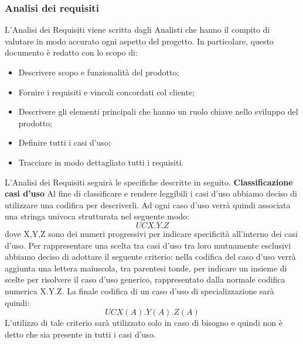     \subsubsection{Analisi dei requisiti}
    	L'Analisi dei Requisiti viene scritta dagli Analisti che hanno il compito di valutare in modo accurato ogni aspetto del progetto. In particolare, questo documento è redatto con lo scopo di:
	    \begin{itemize}
	    	\item Descrivere scopo e funzionalità del prodotto;
	    	\item Fornire i requisiti e vincoli concordati col cliente;
	    	\item Descrivere gli elementi principali che hanno un ruolo chiave nello sviluppo del prodotto;
	    	\item Definire tutti i casi d'uso;
	    	\item Tracciare in modo dettagliato tutti i requisiti.\newline
	    \end{itemize}
    	L'Analisi dei Requisiti seguirà le specifiche descritte in seguito.\newline \newline
    	\textbf{Classificazione casi d'uso}  Al fine di classificare e rendere leggibili i casi d'uso abbiamo deciso di utilizzare una codifica per descriverli. Ad ogni caso d'uso verrà quindi associata una stringa univoca strutturata nel seguente modo:
        \begin{equation}
            UCX.Y.Z    
        \end{equation}
        dove X,Y,Z sono dei numeri progressivi per indicare specificità all'interno dei casi d'uso. \newline
        \newline
        Per rappresentare una scelta tra casi d'uso tra loro mutuamente esclusivi abbiamo deciso di adottare il seguente criterio: nella codifica del caso d'uso verrà aggiunta una lettera maiuscola, tra parentesi tonde, per indicare un insieme di scelte per risolvere il caso d'uso generico, rappresentato dalla normale codifica numerica X.Y.Z. La finale codifica di un caso d'uso di specializzazione sarà quindi:
        \begin{equation}
            UCX(A).Y(A).Z(A)
        \end{equation}
        L'utilizzo di tale criterio sarà utilizzato solo in caso di bisogno e quindi non è detto che sia presente in tutti i casi d'uso.\newline
